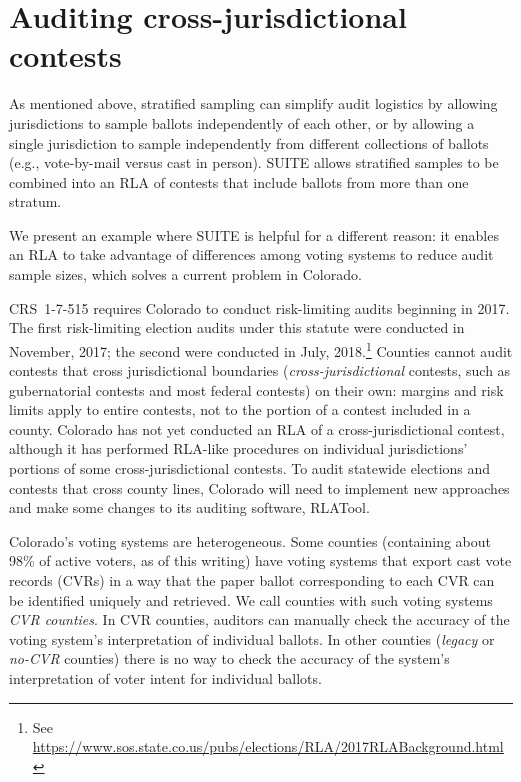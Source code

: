 \documentclass[runningheads]{llncs}
\begin{document}
\section{Auditing cross-jurisdictional contests}\label{sec:combiningMethods}
As mentioned above, stratified sampling can simplify audit logistics by allowing jurisdictions
to sample ballots independently of each other, or by allowing a single jurisdiction to sample 
independently from different collections of ballots (e.g., vote-by-mail versus cast in person).
SUITE allows stratified samples to be combined into an RLA of contests that include ballots from more
than one stratum.

We present an example where SUITE is helpful for a different reason: 
it enables an RLA to take
advantage of differences among voting systems to reduce audit sample sizes, which solves
a current problem in Colorado.

CRS~1-7-515 requires Colorado to conduct risk-limiting audits beginning in 2017.
The first risk-limiting election audits under this statute were conducted in November, 2017; the second were conducted in July, 2018.\footnote{%
 See \url{https://www.sos.state.co.us/pubs/elections/RLA/2017RLABackground.html}
}
Counties cannot audit contests that cross jurisdictional boundaries (\emph{cross-jurisdictional} contests, such as gubernatorial contests and most federal contests)
on their own: margins and risk limits apply to entire contests, not to the portion of a 
contest included in a county.
Colorado has not yet conducted an RLA of a cross-jurisdictional contest, although it has performed RLA-like procedures on individual jurisdictions' portions of some cross-jurisdictional contests.
To audit statewide elections and contests that cross county lines, Colorado will need to implement new approaches and make some changes to its auditing software, RLATool.

Colorado's voting systems are heterogeneous. 
Some counties (containing about 98\% of active voters, as of this writing) have 
voting systems that export cast vote records (CVRs) in a way that the paper ballot corresponding to each CVR can be identified uniquely and retrieved.
We call counties with such voting systems \emph{CVR counties}.
In CVR counties, auditors can manually check the accuracy of the voting system's interpretation of individual ballots.
In other counties (\emph{legacy} or \emph{no-CVR} counties) there is no way to check the accuracy
of the system's interpretation of voter intent for individual ballots.
\end{document}
